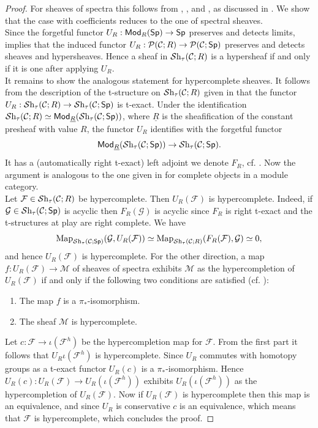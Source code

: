 \documentclass[reqno]{amsart}
\numberwithin{equation}{section}\theoremstyle{thms}
\theoremstyle{defn}
\newcommand{\cC}{\mathcal{C}}
\newcommand{\cF}{\mathcal{F}}
\newcommand{\cG}{\mathcal{G}}
\newcommand{\cM}{\mathcal{M}}
\newcommand{\cP}{\mathcal{P}}
\newcommand{\tn}[1]{\textnormal{#1}}
\newcommand{\tsf}[1]{\textsf{\textup{#1}}}
\newcommand{\mcal}[1]{\mathcal{#1}}
\newcommand{\underl}[1]{\underline{#1}}
\newcommand{\Map}{\tn{Map}}
\newcommand{\sheaves}{\mcal{S}\tn{h}}
\newcommand{\Mod}{\tsf{Mod}}
\newcommand{\spec}{\tsf{Sp}}
\begin{document}
\begin{proof}
For sheaves of spectra this follows from \cite[Lemma 6.5.3.11]{lur09}, \cite{dhi04,tv03}, \cite[Corollary 6.5.3.13]{lur09} and \cite[Proposition 1.3.3.3]{lur18}, as discussed in \cite[Example 2.5]{cm21}. We show that the case with coefficients reduces to the one of spectral sheaves.\\
Since the forgetful functor $U_R: \Mod_R(\spec) \to \spec$ preserves and detects limits, \cite[Remark 2.3.3]{agv22} implies that the induced functor $U_R: \cP(\cC;R) \to \cP(\cC;\spec)$ preserves and detects sheaves and hypersheaves. Hence a sheaf in $\sheaves_{\tau}(\cC; R)$ is a hypersheaf if and only if it is one after applying $U_R$. \\
It remains to show the analogous statement for hypercomplete sheaves. It follows from the description of the t-structure on $\sheaves_{\tau}(\cC; R)$ given in \cite[§2.1.1]{lur18} that the functor $U_R: \sheaves_{\tau}(\cC; R) \to \sheaves_{\tau}(\cC; \spec)$ is t-exact. Under the identification $\sheaves_{\tau}(\cC; R) \simeq \Mod_{\underl{R}}(\sheaves_{\tau}(\cC; \spec))$, where $\underl{R}$ is the sheafification of the constant presheaf with value $R$, the functor $U_R$ identifies with the forgetful functor 
$$\Mod_{\underl{R}}(\sheaves_{\tau}(\cC; \spec)) \to \sheaves_{\tau}(\cC; \spec).$$
It has a (automatically right t-exact) left adjoint we denote $F_R$, cf. \cite[Proposition 2.1.0.3]{lur18}. Now the argument is analogous to the one given in  for complete objects in a  module category. \\
Let $\cF \in \sheaves_{\tau}(\cC; R)$ be hypercomplete. Then $U_R(\cF)$ is hypercomplete. Indeed, if $\cG \in \sheaves_{\tau}(\cC; \spec)$ is acyclic then $F_R(\cG)$ is acyclic since $F_R$ is right t-exact and the t-structures at play are right complete. We have
$$\Map_{\sheaves_{\tau}(\cC; \spec)}(\cG,U_R(\cF)) \simeq \Map_{\sheaves_{\tau}(\cC;R)}(F_R(\cF),\cG) \simeq 0,$$
and hence $U_R(\cF)$ is hypercomplete. For the other direction, a map $f:U_R(\cF) \to \cM$ of sheaves of spectra exhibits $\cM$ as the hypercompletion of $U_R(\cF)$ if and only if the following two conditions are satisfied (cf. \cite[Proposition 2.32]{cm21}):
\begin{enumerate}
    \item The map $f$ is a $\pi_{\ast}$-isomorphism.
    \item The sheaf $\cM$ is hypercomplete.
\end{enumerate}
Let $c: \cF \to \iota(\cF^h)$ be the hypercompletion map for $\cF$. From the first part it follows that $U_R\iota(\cF^h)$ is hypercomplete. Since $U_R$ commutes with homotopy groups as a t-exact functor $U_R(c)$ is a $\pi_{\ast}$-isomorphism. Hence $U_R(c): U_R(\cF) \to U_R(\iota(\cF^h))$ exhibits $U_R(\iota(\cF^h))$ as the hypercompletion of $U_R(\cF)$. Now if $U_R(\cF)$ is hypercomplete then this map is an equivalence, and since $U_R$ is conservative $c$ is an equivalence, which means that $\cF$ is hypercomplete, which concludes the proof.
\end{proof}
\end{document}
